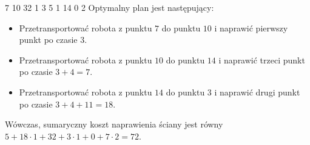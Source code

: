 
 7
10 32 1
3 5 1
14 0 2
\sampleCOMMENT
Optymalny plan jest następujący:
\begin{itemize}
	\item Przetransportować robota z punktu $7$ do punktu $10$
		i naprawić pierwszy punkt po czasie $3$.
	\item Przetransportować robota z punktu $10$ do punktu $14$
		i naprawić trzeci punkt po czasie $3 + 4 = 7$.
	\item Przetransportować robota z punktu $14$ do punktu $3$
		i naprawić drugi punkt po czasie $3 + 4 + 11 = 18$.
\end{itemize}
Wówczas, sumaryczny koszt naprawienia ściany jest równy $5 + 18 \cdot 1 + 32 + 3 \cdot 1 + 0 + 7 \cdot 2 = 72$.
\sampleEND


